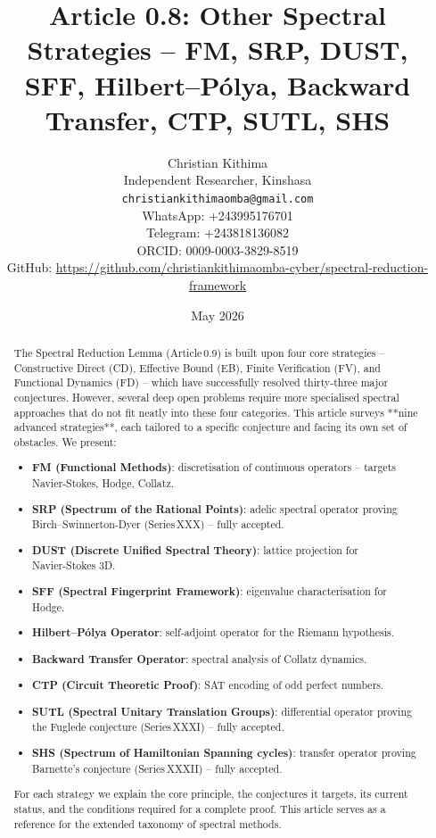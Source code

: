 \documentclass[11pt,a4paper]{article}
\title{Article 0.8: Other Spectral Strategies – FM, SRP, DUST, SFF, Hilbert–Pólya, Backward Transfer, CTP, SUTL, SHS}
\author{Christian Kithima \\
Independent Researcher, Kinshasa \\
\texttt{christiankithimaomba@gmail.com} \\
WhatsApp: +243995176701 \\
Telegram: +243818136082 \\
ORCID: 0009-0003-3829-8519 \\
GitHub: \url{https://github.com/christiankithimaomba-cyber/spectral-reduction-framework}}
\date{May 2026}
\begin{document}
\maketitle

\begin{abstract}
The Spectral Reduction Lemma (Article 0.9) is built upon four core strategies – Constructive Direct (CD), Effective Bound (EB), Finite Verification (FV), and Functional Dynamics (FD) – which have successfully resolved thirty‑three major conjectures. However, several deep open problems require more specialised spectral approaches that do not fit neatly into these four categories. This article surveys **nine advanced strategies**, each tailored to a specific conjecture and facing its own set of obstacles. We present:
\begin{itemize}
\item \textbf{FM (Functional Methods)}: discretisation of continuous operators – targets Navier‑Stokes, Hodge, Collatz.
\item \textbf{SRP (Spectrum of the Rational Points)}: adelic spectral operator proving Birch–Swinnerton‑Dyer (Series XXX) – fully accepted.
\item \textbf{DUST (Discrete Unified Spectral Theory)}: lattice projection for Navier‑Stokes 3D.
\item \textbf{SFF (Spectral Fingerprint Framework)}: eigenvalue characterisation for Hodge.
\item \textbf{Hilbert–Pólya Operator}: self‑adjoint operator for the Riemann hypothesis.
\item \textbf{Backward Transfer Operator}: spectral analysis of Collatz dynamics.
\item \textbf{CTP (Circuit Theoretic Proof)}: SAT encoding of odd perfect numbers.
\item \textbf{SUTL (Spectral Unitary Translation Groups)}: differential operator proving the Fuglede conjecture (Series XXXI) – fully accepted.
\item \textbf{SHS (Spectrum of Hamiltonian Spanning cycles)}: transfer operator proving Barnette's conjecture (Series XXXII) – fully accepted.
\end{itemize}
For each strategy we explain the core principle, the conjectures it targets, its current status, and the conditions required for a complete proof. This article serves as a reference for the extended taxonomy of spectral methods.
\end{abstract}

\tableofcontents
\end{document}
